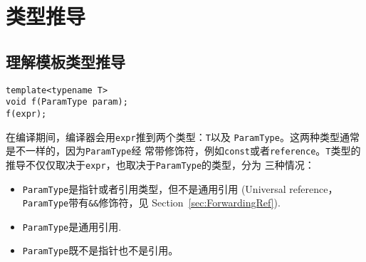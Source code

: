 \newpage

\section{类型推导}

\subsection{理解模板类型推导}
\label{sec:Item2-1}
\begin{verbatim}
template<typename T>
void f(ParamType param);
f(expr);
\end{verbatim}

在编译期间，编译器会用\texttt{expr}推到两个类型：\texttt{T}以及
\texttt{ParamType}。这两种类型通常是不一样的，因为\texttt{ParamType}经
常带修饰符，例如\texttt{const}或者\texttt{reference}。\texttt{T}类型的
推导不仅仅取决于\texttt{expr}，也取决于\texttt{ParamType}的类型，分为
三种情况：
\begin{itemize}
\item \texttt{ParamType}是指针或者引用类型，但不是通用引用
  (Universal reference，\texttt{ParamType}带有\texttt{\&\&}修饰符，见
  Section~\ref{sec:ForwardingRef}).
\item \texttt{ParamType}是通用引用.
\item \texttt{ParamType}既不是指针也不是引用。
\end{itemize}

